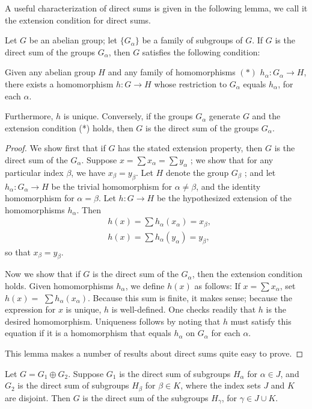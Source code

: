 A useful characterization of direct sums is given in the following lemma, we call it the extension condition for direct sums.

\begin{lemma}
\label{lem:\thetheorem}
Let \(G\) be an abelian group; let \(\{ G_{\alpha }\}\) be a family of subgroups of \(G\). If \(G\) is the direct sum of the groups \(G_{\alpha }\), then \(G\) satisfies the following condition:

Given any abelian group \(H\) and any family of homomorphisms \((*)\) \(h_{\alpha } : G_{\alpha } \rightarrow H\), there exists a homomorphism \(h : G \rightarrow H\) whose restriction to \(G_{\alpha }\) equals \(h_{\alpha }\), for each \(\alpha\).

Furthermore, \(h\) is unique. Conversely, if the groups \(G_{\alpha }\) generate \(G\) and the extension condition (*) holds, then \(G\) is the direct sum of the groups \(G_{\alpha }\).
\end{lemma}

\begin{proof}
We show first that if \(G\) has the stated extension property, then \(G\) is the direct sum of the \(G_{\alpha }\). Suppose \(x = \sum {x}_{\alpha } = \sum {y}_{\alpha }\) ; we show that for any particular index \(\beta\), we have \(x_{\beta } = y_{\beta }\). Let \(H\) denote the group \(G_{\beta }\) ; and let \(h_{\alpha } : G_{\alpha } \rightarrow H\) be the trivial homomorphism for \(\alpha \neq \beta\), and the identity homomorphism for \(\alpha = \beta\). Let \(h : G \rightarrow H\) be the hypothesized extension of the homomorphisms \(h_{\alpha }\). Then
\[
\begin{aligned} & h(x) = \sum {h}_{\alpha }( x_{\alpha }) = x_{\beta }, \\ & h(x) = \sum {h}_{\alpha }( y_{\alpha }) = y_{\beta }, \end{aligned}
\]
so that \(x_{\beta } = y_{\beta }\).

Now we show that if \(G\) is the direct sum of the \(G_{\alpha }\), then the extension condition holds. Given homomorphisms \(h_{\alpha }\), we define \(h(x)\) as follows: If \(x = \sum {x}_{\alpha }\), set \(h(x) =\) \(\sum {h}_{\alpha }( x_{\alpha })\). Because this sum is finite, it makes sense; because the expression for \(x\) is unique, \(h\) is well-defined. One checks readily that \(h\) is the desired homomorphism. Uniqueness follows by noting that \(h\) must satisfy this equation if it is a homomorphism that equals \(h_{\alpha }\) on \(G_{\alpha }\) for each \(\alpha\).

This lemma makes a number of results about direct sums quite easy to prove.
\end{proof}
\begin{corollary}
\label{cor:\thetheorem}
Let \(G = G_{1} \oplus {G}_{2}\). Suppose \(G_{1}\) is the direct sum of subgroups \(H_{\alpha }\) for \(\alpha \in J\), and \(G_{2}\) is the direct sum of subgroups \(H_{\beta }\) for \(\beta \in K\), where the index sets \(J\) and \(K\) are disjoint. Then \(G\) is the direct sum of the subgroups \(H_{\gamma }\), for \(\gamma \in J \cup K\).
\end{corollary}

